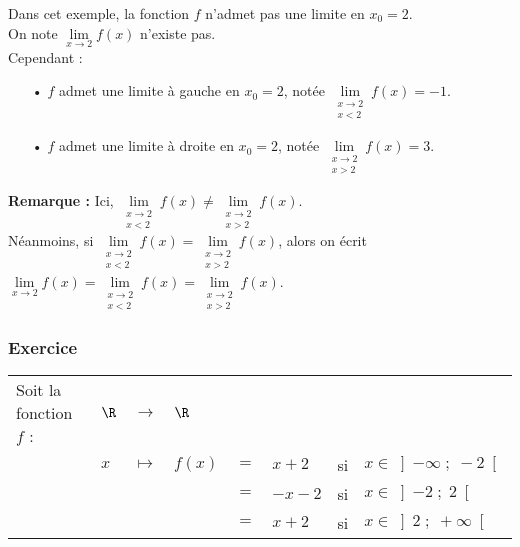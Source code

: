 Dans cet exemple, la fonction $f$ n'admet pas une limite en $x_0 = 2$. \\

On note $\lim\limits_{x \to 2} f(x)$ n'existe pas. \\

Cependant : 

\begin{itemize}
\item[•] $f$ admet une limite à gauche en $x_0 = 2$, notée $\lim\limits_{\substack{x \to 2 \\ x<2}}f(x) = -1$. \\
\item[•] $f$ admet une limite à droite en $x_0 = 2$, notée $\lim\limits_{\substack{x \to 2 \\ x>2}} f(x) = 3$. \\
\end{itemize}

\textbf{Remarque :} Ici, $\lim\limits_{\substack{x \to 2 \\ x<2}}f(x) \neq \lim\limits_{\substack{x \to 2 \\ x>2}} f(x) $. \\

Néanmoins, si $\lim\limits_{\substack{x \to 2 \\ x<2}}f(x) = \lim\limits_{\substack{x \to 2 \\ x>2}} f(x)$, alors on écrit $\lim\limits_{x \to 2} f(x) = \lim\limits_{\substack{x \to 2 \\ x<2}}f(x) = \lim\limits_{\substack{x \to 2 \\ x>2}} f(x)$.

\newpage

\subsubsection{Exercice}

\begin{tabular}{llllllll}
Soit la fonction $f$ : & $\R$ & $\longrightarrow$ & $\R$ & & & & \\
& $x$ & $\longmapsto$ & $f\left(x\right)$ & $ = $ & $ x + 2$ & si & $x \in \left]-\infty \; ; \; -2\right[$ \\
& & & & $=$ & $-x - 2$ &  si & $x \in \left]-2 \; ; \; 2\right[$ \\
& & & & $=$ & $x + 2$ &  si & $x \in \left]2 \; ; \; +\infty\right[$ \\
\end{tabular}

